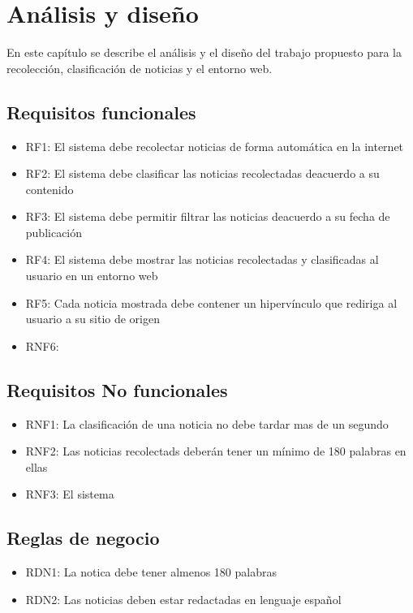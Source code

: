 \chapter{Análisis y diseño}\label{chp:introduccion}

En este capítulo se describe el análisis y el diseño del trabajo propuesto para
la recolección, clasificación de noticias y el entorno web.

\section{Requisitos funcionales}
\begin{itemize}
  \item RF1: El sistema debe recolectar noticias de forma automática en la internet
  \item RF2: El sistema debe clasificar las noticias recolectadas deacuerdo a su contenido
  \item RF3: El sistema debe permitir filtrar las noticias deacuerdo a su fecha de publicación
  \item RF4: El sistema debe mostrar las noticias recolectadas y clasificadas al usuario en un entorno web
  \item RF5: Cada noticia mostrada debe contener un hipervínculo que rediriga al usuario a su sitio de origen 
  \item RNF6:      

\end{itemize}

\section{Requisitos No funcionales}
\begin{itemize}
\section{Estructura del Documento}
  \item RNF1: La clasificación de una noticia no debe tardar mas de un segundo
  \item RNF2: Las noticias recolectads deberán tener un mínimo de 180 palabras en
  ellas
  \item RNF3: El sistema 

\end{itemize}



\section{Reglas de negocio}
\begin{itemize}
\section{Estructura del Documento}
  \item RDN1: La notica debe tener almenos 180 palabras
  \item RDN2: Las noticias deben estar redactadas en lenguaje español

\end{itemize}